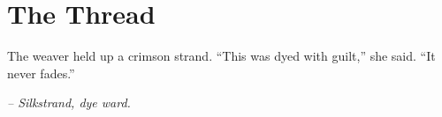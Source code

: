 \chapter*{The Thread}

The weaver held up a crimson strand. ``This was dyed with guilt,'' she said. ``It never fades.''

\smallskip

\noindent \textit{-- Silkstrand, dye ward.}

